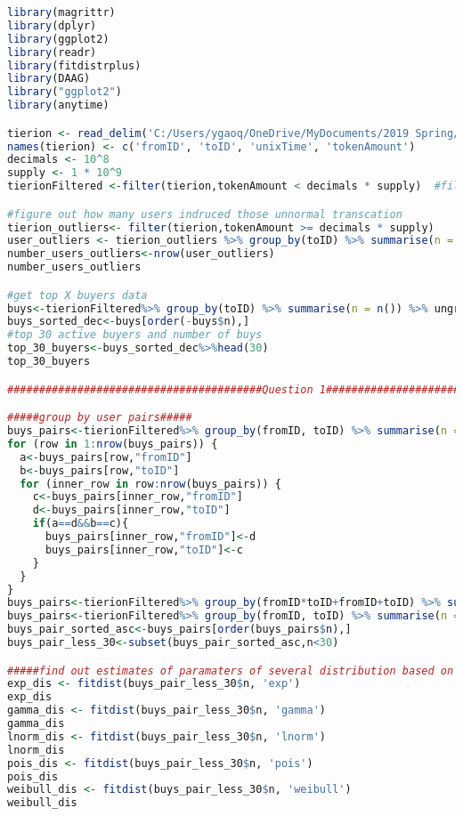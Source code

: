 \usepackage{listings}
\begin{lstlisting}[language=R]
library(magrittr)
library(dplyr)
library(ggplot2)
library(readr)
library(fitdistrplus)
library(DAAG)
library("ggplot2")
library(anytime)

tierion <- read_delim('C:/Users/ygaoq/OneDrive/MyDocuments/2019 Spring/Statistics/Project/Blockchain-Tokens-Data-Analytics/networktierionTX.txt', delim = " ", col_names = F)
names(tierion) <- c('fromID', 'toID', 'unixTime', 'tokenAmount')
decimals <- 10^8
supply <- 1 * 10^9
tierionFiltered <-filter(tierion,tokenAmount < decimals * supply)  #filter out all outliers

#figure out how many users indruced those unnormal transcation
tierion_outliers<- filter(tierion,tokenAmount >= decimals * supply)
user_outliers <- tierion_outliers %>% group_by(toID) %>% summarise(n = n()) %>% ungroup
number_users_outliers<-nrow(user_outliers)
number_users_outliers

#get top X buyers data
buys<-tierionFiltered%>% group_by(toID) %>% summarise(n = n()) %>% ungroup #change the supply and decimals amount
buys_sorted_dec<-buys[order(-buys$n),]
#top 30 active buyers and number of buys
top_30_buyers<-buys_sorted_dec%>%head(30)
top_30_buyers

########################################Question 1############################################

#####group by user pairs#####
buys_pairs<-tierionFiltered%>% group_by(fromID, toID) %>% summarise(n = n()) %>% ungroup
for (row in 1:nrow(buys_pairs)) {
  a<-buys_pairs[row,"fromID"]
  b<-buys_pairs[row,"toID"]
  for (inner_row in row:nrow(buys_pairs)) {
    c<-buys_pairs[inner_row,"fromID"]
    d<-buys_pairs[inner_row,"toID"]
    if(a==d&&b==c){
      buys_pairs[inner_row,"fromID"]<-d
      buys_pairs[inner_row,"toID"]<-c
    }
  }
}
buys_pairs<-tierionFiltered%>% group_by(fromID*toID+fromID+toID) %>% summarise(n = n()) %>% ungroup
buys_pairs<-tierionFiltered%>% group_by(fromID, toID) %>% summarise(n = n()) %>% ungroup
buys_pair_sorted_asc<-buys_pairs[order(buys_pairs$n),]
buys_pair_less_30<-subset(buys_pair_sorted_asc,n<30)

#####find out estimates of paramaters of several distribution based on the buys_pairs data set#####
exp_dis <- fitdist(buys_pair_less_30$n, 'exp')
exp_dis
gamma_dis <- fitdist(buys_pair_less_30$n, 'gamma')
gamma_dis
lnorm_dis <- fitdist(buys_pair_less_30$n, 'lnorm')
lnorm_dis
pois_dis <- fitdist(buys_pair_less_30$n, 'pois')
pois_dis
weibull_dis <- fitdist(buys_pair_less_30$n, 'weibull')
weibull_dis


\end{lstlisting}
